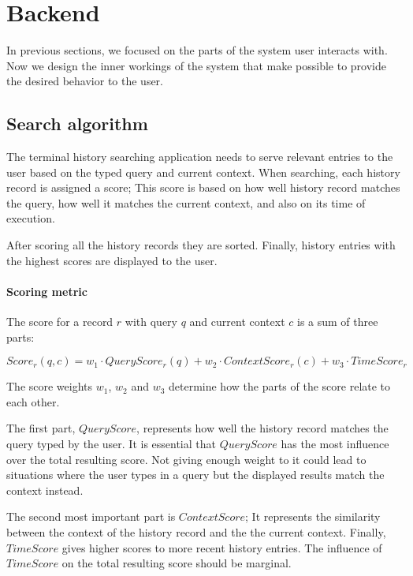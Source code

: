 \documentclass[thesis=M,english]{FITthesis}[2012/10/20]
\begin{document}
\section{Backend}

In previous sections, we focused on the parts of the system user interacts with.
Now we design the inner workings of the system that make possible to provide the desired behavior to the user.

\subsection{Search algorithm}

The terminal history searching application needs to serve relevant entries to the user based on the typed query and current context. When searching, each history record is assigned a score; This score is based on how well history record matches the query, how well it matches the current context, and also on its time of execution. 

After scoring all the history records they are sorted. Finally, history entries with the highest scores are displayed to the user.

\paragraph{Scoring metric}

The score for a record \(r\) with query \(q\) and current context \(c\) is a sum of three parts: 

\[ Score_r(q,c) = w_1 \cdot QueryScore_r(q) + w_2 \cdot ContextScore_r(c) + w_3 \cdot TimeScore_r \]

The score weights \(w_1\), \(w_2\) and \(w_3\) determine how the parts of the score relate to each other. 

The first part, \(QueryScore\), represents how well the history record matches the query typed by the user. It is essential that \(QueryScore\) has the most influence over the total resulting score. Not giving enough weight to it could lead to situations where the user types in a query but the displayed results match the context instead. 

The second most important part is \(ContextScore\); It represents the similarity between the context of the history record and the the current context. Finally, \(TimeScore\) gives higher scores to more recent history entries. The influence of \(TimeScore\) on the total resulting score should be marginal.
\end{document}
